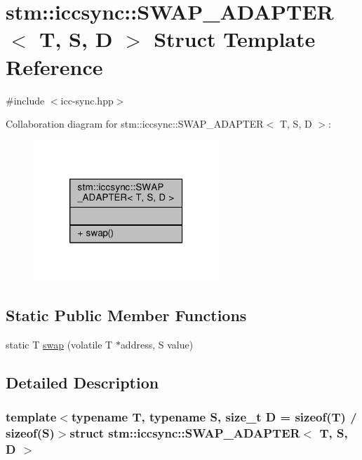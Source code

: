 \hypertarget{structstm_1_1iccsync_1_1SWAP__ADAPTER}{\section{stm\-:\-:iccsync\-:\-:S\-W\-A\-P\-\_\-\-A\-D\-A\-P\-T\-E\-R$<$ T, S, D $>$ Struct Template Reference}
\label{structstm_1_1iccsync_1_1SWAP__ADAPTER}
}


{\ttfamily \#include $<$icc-\/sync.\-hpp$>$}



Collaboration diagram for stm\-:\-:iccsync\-:\-:S\-W\-A\-P\-\_\-\-A\-D\-A\-P\-T\-E\-R$<$ T, S, D $>$\-:
\nopagebreak
\begin{figure}[H]
\begin{center}
\leavevmode
\includegraphics[width=198pt]{structstm_1_1iccsync_1_1SWAP__ADAPTER__coll__graph}
\end{center}
\end{figure}
\subsection*{Static Public Member Functions}
\begin{DoxyCompactItemize}
\item 
static T \hyperlink{structstm_1_1iccsync_1_1SWAP__ADAPTER_a7c21866c3951b11ad255924e1bf28f1f}{swap} (volatile T $\ast$address, S value)
\end{DoxyCompactItemize}


\subsection{Detailed Description}
\subsubsection*{template$<$typename T, typename S, size\-\_\-t D = sizeof(\-T) / sizeof(\-S)$>$struct stm\-::iccsync\-::\-S\-W\-A\-P\-\_\-\-A\-D\-A\-P\-T\-E\-R$<$ T, S, D $>$}

